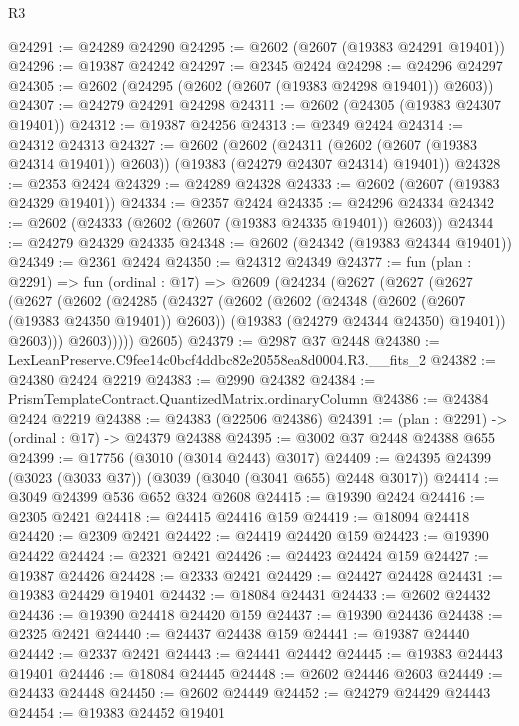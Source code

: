 \begin{lexlean}{R3}
\begin{coremodule}
@24291 := @24289 @24290
@24295 := @2602 (@2607 (@19383 @24291 @19401))
@24296 := @19387 @24242
@24297 := @2345 @2424
@24298 := @24296 @24297
@24305 := @2602 (@24295 (@2602 (@2607 (@19383 @24298 @19401)) @2603))
@24307 := @24279 @24291 @24298
@24311 := @2602 (@24305 (@19383 @24307 @19401))
@24312 := @19387 @24256
@24313 := @2349 @2424
@24314 := @24312 @24313
@24327 := @2602
    (@2602
      (@24311 (@2602 (@2607 (@19383 @24314 @19401)) @2603))
      (@19383 (@24279 @24307 @24314) @19401))
@24328 := @2353 @2424
@24329 := @24289 @24328
@24333 := @2602 (@2607 (@19383 @24329 @19401))
@24334 := @2357 @2424
@24335 := @24296 @24334
@24342 := @2602 (@24333 (@2602 (@2607 (@19383 @24335 @19401)) @2603))
@24344 := @24279 @24329 @24335
@24348 := @2602 (@24342 (@19383 @24344 @19401))
@24349 := @2361 @2424
@24350 := @24312 @24349
@24377 := fun (plan : @2291) =>
  fun (ordinal : @17) =>
  @2609
    (@24234
      (@2627
        (@2627
          (@2627
            (@2627
              (@2602
                (@24285
                  (@24327
                    (@2602
                      (@2602
                        (@24348 (@2602 (@2607 (@19383 @24350 @19401)) @2603))
                        (@19383 (@24279 @24344 @24350) @19401))
                      @2603)))
                @2603)))))
      @2605)
@24379 := @2987 @37 @2448
@24380 := LexLeanPreserve.C9fee14c0bcf4ddbc82e20558ea8d0004.R3.__fits_2
@24382 := @24380 @2424 @2219
@24383 := @2990 @24382
@24384 := PrismTemplateContract.QuantizedMatrix.ordinaryColumn
@24386 := @24384 @2424 @2219
@24388 := @24383 (@22506 @24386)
@24391 := (plan : @2291) -> (ordinal : @17) -> @24379 @24388
@24395 := @3002 @37 @2448 @24388 @655
@24399 := @17756 (@3010 (@3014 @2443) @3017)
@24409 := @24395 @24399 (@3023 (@3033 @37)) (@3039 (@3040 (@3041 @655) @2448 @3017))
@24414 := @3049 @24399 @536 @652 @324 @2608
@24415 := @19390 @2424
@24416 := @2305 @2421
@24418 := @24415 @24416 @159
@24419 := @18094 @24418
@24420 := @2309 @2421
@24422 := @24419 @24420 @159
@24423 := @19390 @24422
@24424 := @2321 @2421
@24426 := @24423 @24424 @159
@24427 := @19387 @24426
@24428 := @2333 @2421
@24429 := @24427 @24428
@24431 := @19383 @24429 @19401
@24432 := @18084 @24431
@24433 := @2602 @24432
@24436 := @19390 @24418 @24420 @159
@24437 := @19390 @24436
@24438 := @2325 @2421
@24440 := @24437 @24438 @159
@24441 := @19387 @24440
@24442 := @2337 @2421
@24443 := @24441 @24442
@24445 := @19383 @24443 @19401
@24446 := @18084 @24445
@24448 := @2602 @24446 @2603
@24449 := @24433 @24448
@24450 := @2602 @24449
@24452 := @24279 @24429 @24443
@24454 := @19383 @24452 @19401

\end{coremodule}
\end{lexlean}
